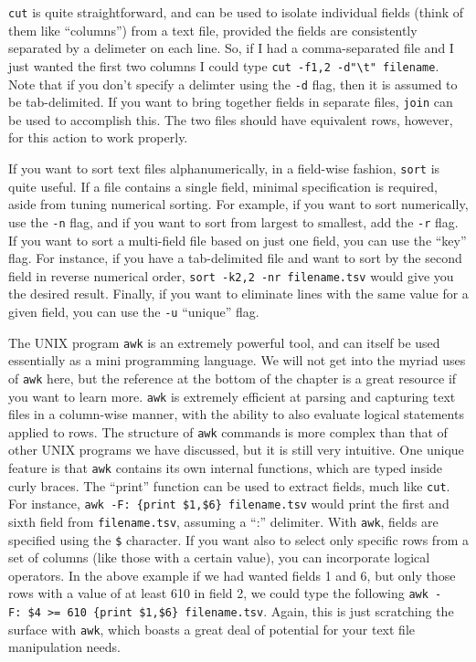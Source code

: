 \documentclass[]{book}
\begin{document}
\texttt{cut} is quite straightforward, and can be used to isolate individual fields (think of them like ``columns'') from a text file, provided the fields are consistently separated by a delimeter on each line. So, if I had a comma-separated file and I just wanted the first two columns I could type \texttt{cut\ -f1,2\ -d"\textbackslash{}t"\ filename}. Note that if you don't specify a delimter using the \texttt{-d} flag, then it is assumed to be tab-delimited. If you want to bring together fields in separate files, \texttt{join} can be used to accomplish this. The two files should have equivalent rows, however, for this action to work properly.

If you want to sort text files alphanumerically, in a field-wise fashion, \texttt{sort} is quite useful. If a file contains a single field, minimal specification is required, aside from tuning numerical sorting. For example, if you want to sort numerically, use the \texttt{-n} flag, and if you want to sort from largest to smallest, add the \texttt{-r} flag. If you want to sort a multi-field file based on just one field, you can use the ``key'' flag. For instance, if you have a tab-delimited file and want to sort by the second field in reverse numerical order, \texttt{sort\ -k2,2\ -nr\ filename.tsv} would give you the desired result. Finally, if you want to eliminate lines with the same value for a given field, you can use the \texttt{-u} ``unique'' flag.

The UNIX program \texttt{awk} is an extremely powerful tool, and can itself be used essentially as a mini programming language. We will not get into the myriad uses of \texttt{awk} here, but the reference at the bottom of the chapter is a great resource if you want to learn more. \texttt{awk} is extremely efficient at parsing and capturing text files in a column-wise manner, with the ability to also evaluate logical statements applied to rows. The structure of \texttt{awk} commands is more complex than that of other UNIX programs we have discussed, but it is still very intuitive. One unique feature is that \texttt{awk} contains its own internal functions, which are typed inside curly braces. The ``print'' function can be used to extract fields, much like \texttt{cut}. For instance, \texttt{awk\ -F:\ \textquotesingle{}\{print\ \$1,\$6\}\textquotesingle{}\ filename.tsv} would print the first and sixth field from \texttt{filename.tsv}, assuming a ``:'' delimiter. With \texttt{awk}, fields are specified using the \texttt{\$} character. If you want also to select only specific rows from a set of columns (like those with a certain value), you can incorporate logical operators. In the above example if we had wanted fields 1 and 6, but only those rows with a value of at least 610 in field 2, we could type the following \texttt{awk\ -F:\ \textquotesingle{}\$4\ \textgreater{}=\ 610\ \{print\ \$1,\$6\}\textquotesingle{}\ filename.tsv}. Again, this is just scratching the surface with \texttt{awk}, which boasts a great deal of potential for your text file manipulation needs.
\end{document}
